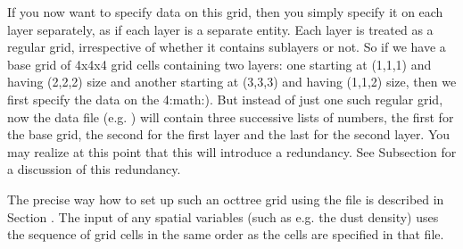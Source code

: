 \documentclass[letterpaper,10pt,english]{sphinxmanual}
\begin{document}
If you now want to specify data on this grid, then you simply specify it on
each layer separately, as if each layer is a separate entity. Each layer is
treated as a regular grid, irrespective of whether it contains sub\sphinxhyphen{}layers
or not. So if we have a base grid of 4x4x4 grid cells containing two layers:
one starting at (1,1,1) and having (2,2,2) size and another starting at
(3,3,3) and having (1,1,2) size, then we first specify the data on the
4:math:). But instead of just one such regular grid, now
the data file (e.g. ) will contain three
successive lists of numbers, the first for the base grid, the second for
the first layer and the last for the second layer. You may realize at this
point that this will introduce a redundancy. See Subsection
{\hyperref[\detokenize{gridding:sec-layer-amr-redundancy}]{}} for a discussion of this redundancy.

The precise way how to set up such an oct\sphinxhyphen{}tree grid using the 
file is described in Section {\hyperref[\detokenize{inputoutputfiles:sec-amr-grid-layered}]{}}.  The input of any
spatial variables (such as e.g. the dust density) uses the sequence of grid
cells in the same order as the cells are specified in that 
file.
\end{document}
